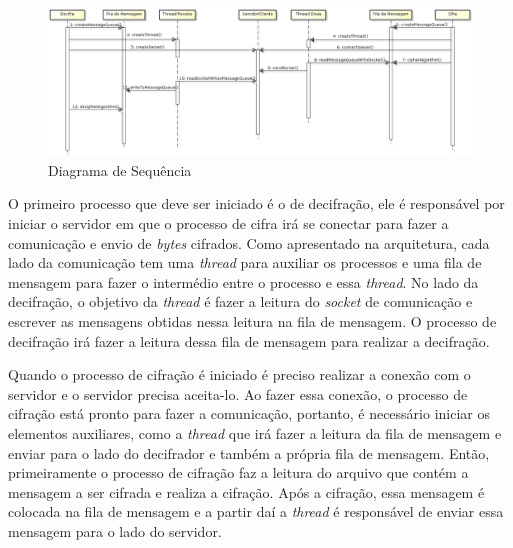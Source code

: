 \begin{figure}[h]
	\centering
	\includegraphics[scale=0.5, angle = 90]{figuras/sequenceDiagram.eps}
	\caption{Diagrama de Sequência}
	\label{sequence-diagram}
\end{figure}

O primeiro processo que deve ser iniciado é o de decifração, ele é responsável por iniciar o servidor em que o processo de cifra irá se conectar para fazer a comunicação e envio de \textit{bytes} cifrados. Como apresentado na arquitetura, cada lado da comunicação tem uma \textit{thread} para auxiliar os processos e uma fila de mensagem para fazer o intermédio entre o processo e essa \textit{thread}. No lado da decifração, o objetivo da \textit{thread} é fazer a leitura do \textit{socket} de comunicação e escrever as mensagens obtidas nessa leitura na fila de mensagem. O processo de decifração irá fazer a leitura dessa fila de mensagem para realizar a decifração.

Quando o processo de cifração é iniciado é preciso realizar a conexão com o servidor e o servidor precisa aceita-lo. Ao fazer essa conexão, o processo de cifração está pronto para fazer a comunicação, portanto, é necessário iniciar os elementos auxiliares, como a \textit{thread} que irá fazer a leitura da fila de mensagem e enviar para o lado do decifrador e também a própria fila de mensagem. Então, primeiramente o processo de cifração faz a leitura do arquivo que contém a mensagem a ser cifrada e realiza a cifração. Após a cifração, essa mensagem é colocada na fila de mensagem e a partir daí a \textit{thread} é responsável de enviar essa mensagem para o lado do servidor.